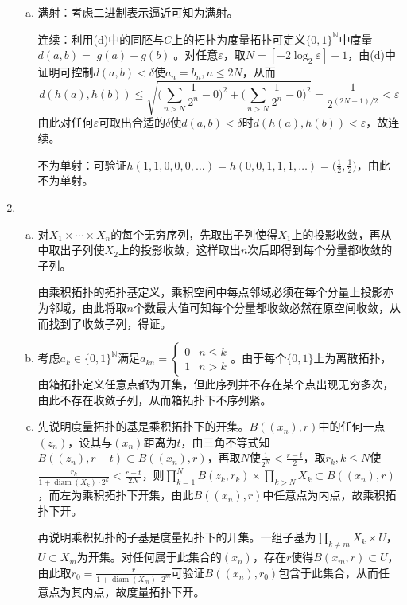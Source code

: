 \documentclass[a4paper,UTF8,fontset=windows]{ctexart}
\DeclareMathOperator{\diam}{diam}
\begin{document}
\begin{enumerate}[(1)]
\begin{enumerate}[(a)]
    \item
    
    满射：考虑二进制表示逼近可知为满射。
    
    连续：利用(d)中的同胚与$C$上的拓扑为度量拓扑可定义$\{0,1\}^\mathbb{N}$中度量$d(a,b)=|g(a)-g(b)|$。对任意$\varepsilon$，取$N=[-2\log_2{\varepsilon}]+1$，由(d)中证明可控制$d(a,b)<\delta$使$a_n=b_n,n\le 2N$，从而
    \[d(h(a),h(b))\le\sqrt{\bigg(\sum_{n>N}\frac{1}{2^n}-0\bigg)^2+\bigg(\sum_{n>N}\frac{1}{2^n}-0\bigg)^2}=\frac{1}{2^{(2N-1)/2}}<\varepsilon\]
    由此对任何$\varepsilon$可取出合适的$\delta$使$d(a,b)<\delta$时$d(h(a),h(b))<\varepsilon$，故连续。
    
    不为单射：可验证$h(1,1,0,0,0,\dots)=h(0,0,1,1,1,\dots)=\big(\frac{1}{2},\frac{1}{2}\big)$，由此不为单射。
    \end{enumerate}
    
    \item
    \begin{enumerate}[(a)]
    \item
    对$X_1\times\cdots\times X_n$的每个无穷序列，先取出子列使得$X_1$上的投影收敛，再从中取出子列使$X_2$上的投影收敛，这样取出$n$次后即得到每个分量都收敛的子列。
    
    由乘积拓扑的拓扑基定义，乘积空间中每点邻域必须在每个分量上投影亦为邻域，由此将取$n$个数最大值可知每个分量都收敛必然在原空间收敛，从而找到了收敛子列，得证。
    
    \item
    考虑$a_k\in\{0,1\}^\mathbb{N}$满足$a_{kn}=\begin{cases}0&n\le k\\1&n>k\end{cases}$。由于每个$\{0,1\}$上为离散拓扑，由箱拓扑定义任意点都为开集，但此序列并不存在某个点出现无穷多次，由此不存在收敛子列，从而箱拓扑下不序列紧。
    
    \item
    先说明度量拓扑的基是乘积拓扑下的开集。$B((x_n),r)$中的任何一点$(z_n)$，设其与$(x_n)$距离为$t$，由三角不等式知$B((z_n),r-t)\subset B((x_n),r)$，再取$N$使$\frac{1}{2^N}<\frac{r-t}{2}$，取$r_k,k\le N$使$\frac{r_k}{1+\diam(X_k)\cdot 2^k}<\frac{r-t}{2N}$，则$\prod_{k=1}^NB(z_k,r_k)\times\prod_{k>N}X_k\subset B((x_n),r)$，而左为乘积拓扑下开集，由此$B((x_n),r)$中任意点为内点，故乘积拓扑下开。
    
    再说明乘积拓扑的子基是度量拓扑下的开集。一组子基为$\prod_{k\ne m}X_k\times U$，$U\subset X_m$为开集。对任何属于此集合的$(x_n)$，存在$r$使得$B(x_m,r)\subset U$，由此取$r_0=\frac{r}{1+\diam(X_m)\cdot 2^m}$可验证$B((x_n),r_0)$包含于此集合，从而任意点为其内点，故度量拓扑下开。
    

\end{enumerate}
\end{enumerate}
\end{document}
